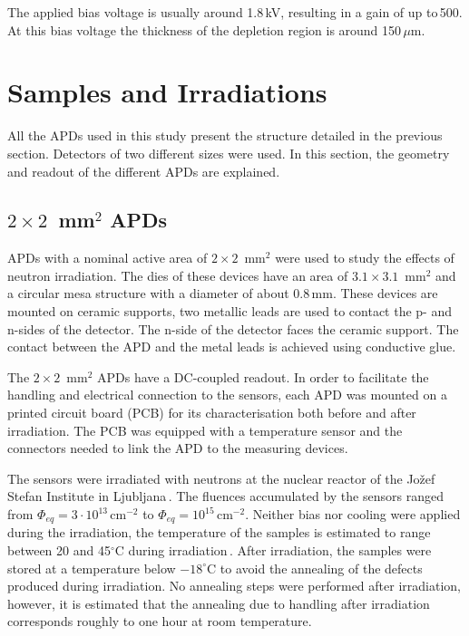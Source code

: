 \documentclass{article}
\begin{document}
The applied bias voltage is usually around 1.8\,kV, resulting in a gain of up to\,500.
At this bias voltage the thickness of the depletion region is around 150\,$\mu$m.


\section{Samples and Irradiations}
\label{sec:samples}

All the APDs used in this study present the structure detailed in the previous section.
Detectors of two different sizes were used.
In this section, the geometry and readout of the different APDs are explained.

\subsection{$2 \times 2$~mm$^2$ APDs}

APDs with a nominal active area of $2 \times 2$~mm$^2$ were used to study the effects of neutron irradiation.
The dies of these devices have an area of $3.1 \times 3.1$~mm$^2$ and a circular mesa structure with a diameter of about 0.8\,mm.
These devices are mounted on ceramic supports, two metallic leads are used to contact the p- and n-sides of the detector.
The n-side of the detector faces the ceramic support.
The contact between the APD and the metal leads is achieved using conductive glue.

The $2 \times 2$~mm$^2$ APDs have a DC-coupled readout.
In order to facilitate the handling and electrical connection to the sensors, each APD was mounted on a printed circuit board (PCB) for its characterisation both before and after irradiation.
The PCB was equipped with a temperature sensor and the connectors needed to link the APD to the measuring devices.

The sensors were irradiated with neutrons at the nuclear reactor of the Jo\v{z}ef Stefan Institute in Ljubljana\,\cite{jsiIrrad}.
The fluences accumulated by the sensors ranged from $\Phi_{eq} = 3 \cdot 10^{13}$\,cm$^{-2}$ to $\Phi_{eq} = 10^{15}$\,cm$^{-2}$.
Neither bias nor cooling were applied during the irradiation, the temperature of the samples is estimated to range between 20 and 45$^\circ$C during irradiation\,\cite{vlado}.
After irradiation, the samples were stored at a temperature below $-18^\circ$C to avoid the annealing of the defects produced during irradiation.
No annealing steps were performed after irradiation, however, it is estimated that the annealing due to handling after irradiation corresponds roughly to one hour at room temperature.
\end{document}
